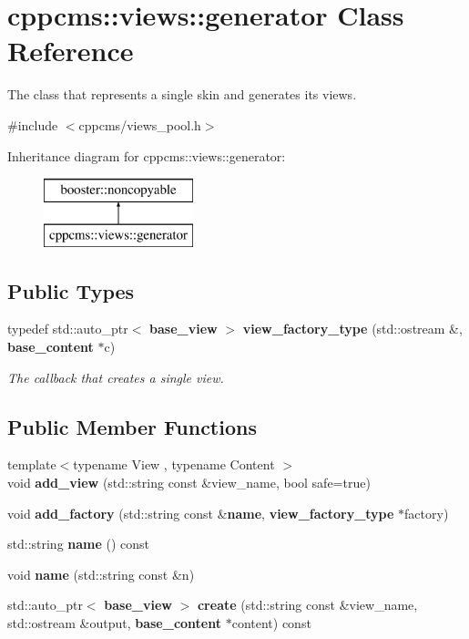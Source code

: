 \section{cppcms\-:\-:views\-:\-:generator \-Class \-Reference}
\label{classcppcms_1_1views_1_1generator}


\-The class that represents a single skin and generates its views.  




{\ttfamily \#include $<$cppcms/views\-\_\-pool.\-h$>$}

\-Inheritance diagram for cppcms\-:\-:views\-:\-:generator\-:\begin{figure}[H]
\begin{center}
\leavevmode
\includegraphics[height=2.000000cm]{classcppcms_1_1views_1_1generator}
\end{center}
\end{figure}
\subsection*{\-Public \-Types}
\begin{DoxyCompactItemize}
\item 
typedef std\-::auto\-\_\-ptr$<$ {\bf base\-\_\-view} $>$ {\bf view\-\_\-factory\-\_\-type} (std\-::ostream \&, {\bf base\-\_\-content} $\ast$c)\label{classcppcms_1_1views_1_1generator_af51d091d42138b8c06fbc2cba5d71c83}

\begin{DoxyCompactList}\small\item\em \-The callback that creates a single view. \end{DoxyCompactList}\end{DoxyCompactItemize}
\subsection*{\-Public \-Member \-Functions}
\begin{DoxyCompactItemize}
\item 
{\footnotesize template$<$typename View , typename Content $>$ }\\void {\bf add\-\_\-view} (std\-::string const \&view\-\_\-name, bool safe=true)
\item 
void {\bf add\-\_\-factory} (std\-::string const \&{\bf name}, {\bf view\-\_\-factory\-\_\-type} $\ast$factory)
\item 
std\-::string {\bf name} () const 
\item 
void {\bf name} (std\-::string const \&n)
\item 
std\-::auto\-\_\-ptr$<$ {\bf base\-\_\-view} $>$ {\bf create} (std\-::string const \&view\-\_\-name, std\-::ostream \&output, {\bf base\-\_\-content} $\ast$content) const 
\end{DoxyCompactItemize}


